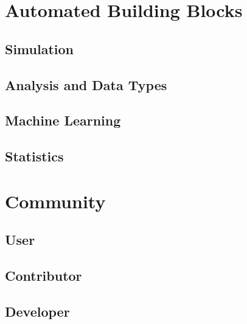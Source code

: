 \section{Automated Building Blocks}
\subsection{Simulation}
\subsection{Analysis and Data Types}
\subsection{Machine Learning}
\subsection{Statistics}

\section{Community}
\subsection{User}
\subsection{Contributor}
\subsection{Developer}



